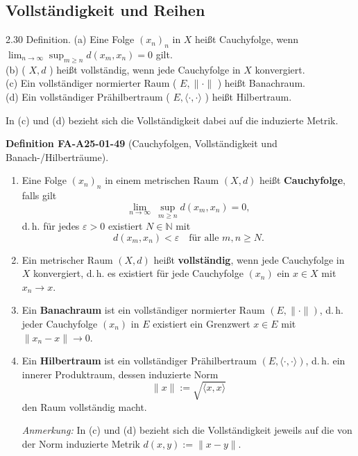 \documentclass[10pt, letterpaper]{article}
\newcommand{\CustomHeading}[3]{%
  \par\medskip\noindent%
  \textbf{#1 #2} \textnormal{(#3)}.\enskip%
}
\newenvironment{DEF}[2]{\begin{unitbox}\CustomHeading{Definition}{#1}{#2}}{\end{unitbox}}
\begin{document}
\pagebreak

\subsection*{Vollständigkeit und Reihen}


2.30 Definition. (a) Eine Folge $\left(x_{n}\right)_{n}$ in $X$ heißt Cauchyfolge, wenn $\lim _{n \rightarrow \infty} \sup _{m \geq n} d\left(x_{m}, x_{n}\right)=0$ gilt.\\
(b) ( $X, d$ ) heißt vollständig, wenn jede Cauchyfolge in $X$ konvergiert.\\
(c) Ein vollständiger normierter Raum ( $E,\|\cdot\|$ ) heißt Banachraum.\\
(d) Ein vollständiger Prähilbertraum ( $E,\langle\cdot, \cdot\rangle$ ) heißt Hilbertraum.

In (c) und (d) bezieht sich die Vollständigkeit dabei auf die induzierte Metrik.\\



\begin{DEF}{FA-A25-01-49}{Cauchyfolgen, Vollständigkeit und Banach-/Hilberträume}
\begin{enumerate}
\item[(a)] Eine Folge $\left(x_{n}\right)_{n}$ in einem metrischen Raum $(X,d)$ heißt \textbf{Cauchyfolge}, falls gilt
\[
\lim_{n\to\infty}\ \sup_{m\ge n} d(x_m,x_n)=0,
\]
d.\,h. für jedes $\varepsilon>0$ existiert $N\in\mathbb{N}$ mit
\[
d(x_m,x_n)<\varepsilon \quad\text{für alle } m,n\ge N.
\]

\item[(b)] Ein metrischer Raum $(X,d)$ heißt \textbf{vollständig}, wenn jede Cauchyfolge in $X$ konvergiert, d.\,h. es existiert für jede Cauchyfolge $(x_n)$ ein $x\in X$ mit $x_n\to x$.

\item[(c)] Ein \textbf{Banachraum} ist ein vollständiger normierter Raum $(E,\|\cdot\|)$, d.\,h. jeder Cauchyfolge $(x_n)$ in $E$ existiert ein Grenzwert $x\in E$ mit $\|x_n - x\| \to 0$.

\item[(d)] Ein \textbf{Hilbertraum} ist ein vollständiger Prähilbertraum $(E,\langle\cdot,\cdot\rangle)$, d.\,h. ein innerer Produktraum, dessen induzierte Norm
\[
\|x\|:=\sqrt{\langle x,x\rangle}
\]
den Raum vollständig macht.

\smallskip
\textit{Anmerkung:} In (c) und (d) bezieht sich die Vollständigkeit jeweils auf die von der Norm induzierte Metrik $d(x,y):=\|x-y\|$.
\end{enumerate}
\end{DEF}
\end{document}
